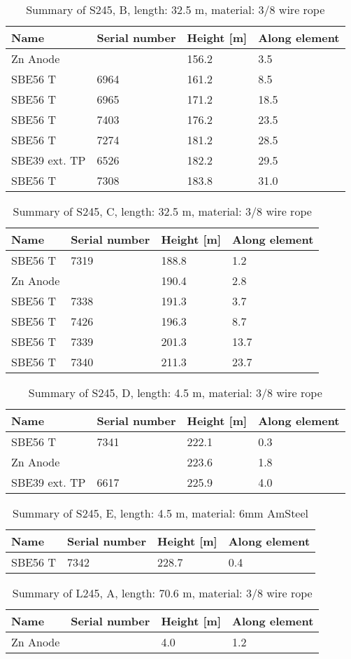 \documentclass{article}
\begin{document}
\begin{table}[!htbp]
\centering
\caption{Summary of S245, B, length: 32.5 m, material: 3/8 wire rope}
\begin{tabular}{llll}
\toprule
Name & Serial number & Height [m] & Along element \\
\midrule
Zn Anode &  & 156.2 & 3.5 \\
SBE56 T & 6964 & 161.2 & 8.5 \\
SBE56 T & 6965 & 171.2 & 18.5 \\
SBE56 T & 7403 & 176.2 & 23.5 \\
SBE56 T & 7274 & 181.2 & 28.5 \\
SBE39 ext. TP & 6526 & 182.2 & 29.5 \\
SBE56 T & 7308 & 183.8 & 31.0 \\
\bottomrule
\end{tabular}
\end{table}

\begin{table}[!htbp]
\centering
\caption{Summary of S245, C, length: 32.5 m, material: 3/8 wire rope}
\begin{tabular}{llll}
\toprule
Name & Serial number & Height [m] & Along element \\
\midrule
SBE56 T & 7319 & 188.8 & 1.2 \\
Zn Anode &  & 190.4 & 2.8 \\
SBE56 T & 7338 & 191.3 & 3.7 \\
SBE56 T & 7426 & 196.3 & 8.7 \\
SBE56 T & 7339 & 201.3 & 13.7 \\
SBE56 T & 7340 & 211.3 & 23.7 \\
\bottomrule
\end{tabular}
\end{table}

\begin{table}[!htbp]
\centering
\caption{Summary of S245, D, length: 4.5 m, material: 3/8 wire rope}
\begin{tabular}{llll}
\toprule
Name & Serial number & Height [m] & Along element \\
\midrule
SBE56 T & 7341 & 222.1 & 0.3 \\
Zn Anode &  & 223.6 & 1.8 \\
SBE39 ext. TP & 6617 & 225.9 & 4.0 \\
\bottomrule
\end{tabular}
\end{table}

\begin{table}[!htbp]
\centering
\caption{Summary of S245, E, length: 4.5 m, material: 6mm AmSteel}
\begin{tabular}{llll}
\toprule
Name & Serial number & Height [m] & Along element \\
\midrule
SBE56 T & 7342 & 228.7 & 0.4 \\
\bottomrule
\end{tabular}
\end{table}

\begin{table}[!htbp]
\centering
\caption{Summary of L245, A, length: 70.6 m, material: 3/8 wire rope}
\begin{tabular}{llll}
\toprule
Name & Serial number & Height [m] & Along element \\
\midrule
Zn Anode &  & 4.0 & 1.2 \\
\bottomrule
\end{tabular}
\end{table}
\end{document}
